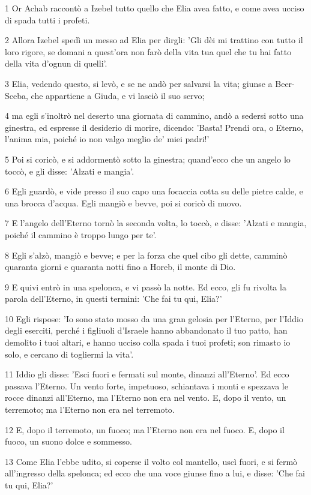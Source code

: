 \par 1 Or Achab raccontò a Izebel tutto quello che Elia avea fatto, e come avea ucciso di spada tutti i profeti.
\par 2 Allora Izebel spedì un messo ad Elia per dirgli: 'Gli dèi mi trattino con tutto il loro rigore, se domani a quest'ora non farò della vita tua quel che tu hai fatto della vita d'ognun di quelli'.
\par 3 Elia, vedendo questo, si levò, e se ne andò per salvarsi la vita; giunse a Beer-Sceba, che appartiene a Giuda, e vi lasciò il suo servo;
\par 4 ma egli s'inoltrò nel deserto una giornata di cammino, andò a sedersi sotto una ginestra, ed espresse il desiderio di morire, dicendo: 'Basta! Prendi ora, o Eterno, l'anima mia, poiché io non valgo meglio de' miei padri!'
\par 5 Poi si coricò, e si addormentò sotto la ginestra; quand'ecco che un angelo lo toccò, e gli disse: 'Alzati e mangia'.
\par 6 Egli guardò, e vide presso il suo capo una focaccia cotta su delle pietre calde, e una brocca d'acqua. Egli mangiò e bevve, poi si coricò di nuovo.
\par 7 E l'angelo dell'Eterno tornò la seconda volta, lo toccò, e disse: 'Alzati e mangia, poiché il cammino è troppo lungo per te'.
\par 8 Egli s'alzò, mangiò e bevve; e per la forza che quel cibo gli dette, camminò quaranta giorni e quaranta notti fino a Horeb, il monte di Dio.
\par 9 E quivi entrò in una spelonca, e vi passò la notte. Ed ecco, gli fu rivolta la parola dell'Eterno, in questi termini: 'Che fai tu qui, Elia?'
\par 10 Egli rispose: 'Io sono stato mosso da una gran gelosia per l'Eterno, per l'Iddio degli eserciti, perché i figliuoli d'Israele hanno abbandonato il tuo patto, han demolito i tuoi altari, e hanno ucciso colla spada i tuoi profeti; son rimasto io solo, e cercano di togliermi la vita'.
\par 11 Iddio gli disse: 'Esci fuori e fermati sul monte, dinanzi all'Eterno'. Ed ecco passava l'Eterno. Un vento forte, impetuoso, schiantava i monti e spezzava le rocce dinanzi all'Eterno, ma l'Eterno non era nel vento. E, dopo il vento, un terremoto; ma l'Eterno non era nel terremoto.
\par 12 E, dopo il terremoto, un fuoco; ma l'Eterno non era nel fuoco. E, dopo il fuoco, un suono dolce e sommesso.
\par 13 Come Elia l'ebbe udito, si coperse il volto col mantello, uscì fuori, e si fermò all'ingresso della spelonca; ed ecco che una voce giunse fino a lui, e disse: 'Che fai tu qui, Elia?'
